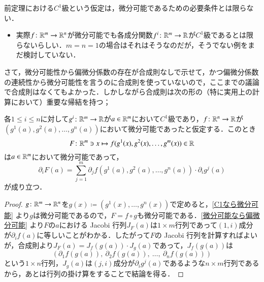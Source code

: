 \begin{que}[*]
前定理における$C^1$級という仮定は，微分可能であるための必要条件とは限らない．
\begin{itemize}
\item 実際$f \colon \mathbb{R}^m \to \mathbb{R}^n$が微分可能でも各成分関数$f^i \colon \mathbb{R}^m \to \mathbb{R}$が$C^1$級であるとは限らないらしい．$m=n=1$の場合はそれはそうなのだが，そうでない例をまだ検討していない．
\end{itemize}
\end{que}

さて，微分可能性から偏微分係数の存在が合成則なしで示せて，かつ偏微分係数の連続性から微分可能性を言うのに合成則を使っていないので，ここまでの議論で合成則はなくてもよかった．しかしながら合成則は次の形の（特に実用上の計算において）重要な帰結を持つ；

\begin{prop}\label{実用的な方の合成則}
各$1 \leq i \leq n$に対して$g^i \colon \mathbb{R}^m \to \mathbb{R}$が$a \in \mathbb{R}^m$において$C^1$級であり，$f \colon \mathbb{R}^n \to \mathbb{R}$が$(g^1(a), g^2(a), \dots, g^n(a))$において微分可能であったと仮定する．このとき
\begin{equation}
F \colon \mathbb{R}^m \ni x \mapsto f(g^1(x), g^2(x), \dots, g^m(x)) \in \mathbb{R}
\end{equation}
は$a \in \mathbb{R}^m$において微分可能であって，
\begin{equation}
\partial_i F (a) = \sum_{j=1}^m \partial_j f(g^1(a), g^2(a), \dots, g^n(a)) \cdot \partial_i g^j (a)
\end{equation}が成り立つ．
\end{prop}

\begin{proof}
$g \colon \mathbb{R}^m \to \mathbb{R}^n$を$g(x) \coloneqq (g^1(x), \dots, g^n(x))$で定めると，\cref{C1なら微分可能} より$g$は微分可能であるので，$F = f \circ g$も微分可能である．\cref{微分可能なら偏微分可能} より$F$の$a$における Jacobi 行列$J_F(a)$は$1 \times m$行列であって$(1,i)$成分が$\partial_i f (a)$に等しいことがわかる．したがって$F$の Jacobi 行列を計算すればよいが，合成則より$J_F(a) = J_f (g(a)) \cdot J_g(a)$であって，$J_f(g(a))$は
\begin{equation}
\left( \partial_1 f(g(a)),\ \partial_2 f(g(a)),\ \dots,\ \partial_n f(g(a))  \right)
\end{equation}という$1 \times n$行列，$J_g(a)$は$(j,i)$成分が$\partial_i g^j(a)$であるような$n \times m$行列であるから，あとは行列の掛け算をすることで結論を得る．
\end{proof}


